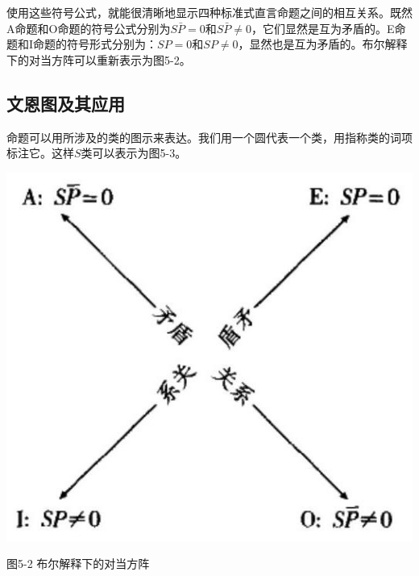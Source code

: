 使用这些符号公式，就能很清晰地显示四种标准式直言命题之间的相互关系。既然A命题和O命题的符号公式分别为$S\bar{P}=0$和$S\bar{P} \neq 0$，它们显然是互为矛盾的。E命题和I命题的符号形式分别为：$SP=0$和$SP \neq 0$，显然也是互为矛盾的。布尔解释下的对当方阵可以重新表示为图5-2。

\subsection{文恩图及其应用}

命题可以用所涉及的类的图示来表达。我们用一个圆代表一个类，用指称类的词项标注它。这样$S$类可以表示为图5-3。

\begin{center}
\includegraphics[width=\textwidth]{images/2025_05_15_6a28331d5e7c993ad07ag-257(2).jpg}

图5-2 布尔解释下的对当方阵
\end{center}

